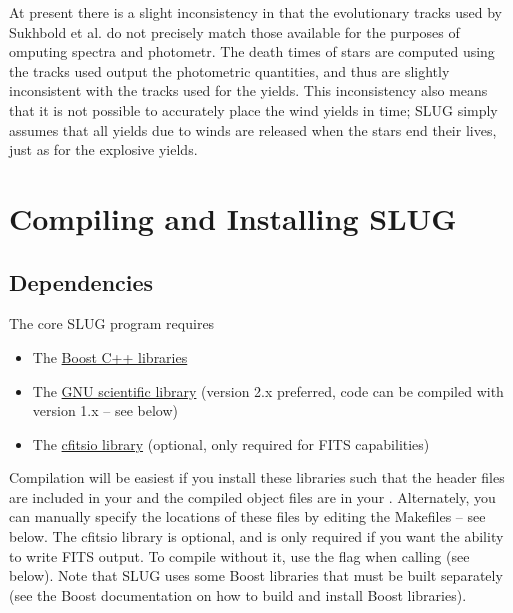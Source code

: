 \documentclass[letterpaper,10pt,english]{sphinxmanual}
\begin{document}
At present there is a slight inconsistency in that the evolutionary tracks used by Sukhbold et al. do not precisely match those available for the purposes of omputing spectra and photometr. The death times of stars are computed using the tracks used output the photometric quantities, and thus are slightly inconsistent with the tracks used for the yields. This inconsistency also means that it is not possible to accurately place the wind yields in time; SLUG simply assumes that all yields due to winds are released when the stars end their lives, just as for the explosive yields.


\chapter{Compiling and Installing SLUG}
\label{compiling::doc}\label{compiling:compiling-and-installing-slug}

\section{Dependencies}
\label{compiling:dependencies}
The core SLUG program requires
\begin{itemize}
\item {} 
The \href{http://www.boost.org/}{Boost C++ libraries}

\item {} 
The \href{http://www.gnu.org/software/gsl/}{GNU scientific library} (version 2.x preferred, code can be compiled with version 1.x -- see below)

\item {} 
The \href{http://heasarc.gsfc.nasa.gov/fitsio/fitsio.html}{cfitsio library} (optional, only required for FITS capabilities)

\end{itemize}

Compilation will be easiest if you install these libraries such that the header files are included in your  and the compiled object files are in your . Alternately, you can manually specify the locations of these files by editing the Makefiles -- see below. The cfitsio library is optional, and is only required if you want the ability to write FITS output. To compile without it, use the flag  when calling  (see below). Note that SLUG uses some Boost libraries that must be built separately (see the Boost documentation on how to build and install Boost libraries).
\end{document}

